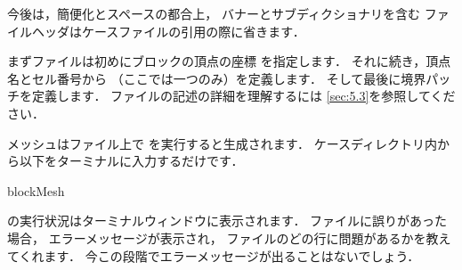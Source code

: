 今後は，簡便化とスペースの都合上，
バナーとサブディクショナリを含む
ファイルヘッダはケースファイルの引用の際に省きます．

まずファイルは初めにブロックの頂点の座標
%
%
を指定します．
それに続き，頂点名とセル番号から
%
%
（ここでは一つのみ）を定義します．
そして最後に境界パッチを定義します．
ファイルの記述の詳細を理解するには
\autoref{sec:5.3}を参照してください．

メッシュはファイル上で
を実行すると生成されます．
ケースディレクトリ内から以下をターミナルに入力するだけです．
\begin{OFverbatim}[terminal]
blockMesh
\end{OFverbatim}
の実行状況はターミナルウィンドウに表示されます．
%
%
ファイルに誤りがあった場合，
エラーメッセージが表示され，
ファイルのどの行に問題があるかを教えてくれます．
今この段階でエラーメッセージが出ることはないでしょう．

